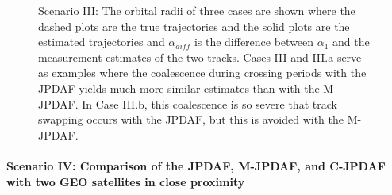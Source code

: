 \begin{figure}
{
\centerline{
	}
\centerline{
	}
}
\caption{Scenario III: The orbital radii of three cases are shown where the dashed plots are the true trajectories and the solid plots are the estimated trajectories and $\alpha_{diff}$ is the difference between $\alpha_{1}$ and the measurement estimates of the two tracks.
Cases III and III.a serve as examples where the coalescence during crossing periods with the JPDAF yields much more similar estimates than with the M-JPDAF.
In Case III.b, this coalescence is so severe that track swapping occurs with the JPDAF, but this is avoided with the M-JPDAF.
}\label{fig:III}
\end{figure}






































\paragraph*{Scenario IV: Comparison of the JPDAF, M-JPDAF, and C-JPDAF with two GEO satellites in close proximity}\ 

